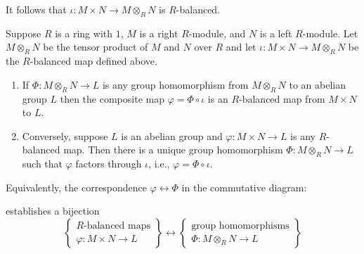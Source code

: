 \documentclass[12pt, a4paper, oneside, openright, titlepage]{book}
\begin{document}
It follows that $\iota:M\times N\rightarrow M\otimes_RN$ is $R$-balanced. 

\begin{thm}
    Suppose $R$ is a ring with $1$, $M$ is a right $R$-module, and $N$ is a left $R$-module. Let $M\otimes_RN$ be the tensor product of $M$ and $N$ over $R$ and let $\iota:M\times N\rightarrow M\otimes_RN$ be the $R$-balanced map defined above.
    \begin{enumerate}
        \item If $\Phi:M\otimes_RN\rightarrow L$ is any group homomorphism from $M\otimes_RN$ to an abelian group $L$ then the composite map $\varphi = \Phi\circ \iota$ is an $R$-balanced map from $M\times N$ to $L$.
        \item Conversely, suppose $L$ is an abelian group and $\varphi:M\times N\rightarrow L$ is any $R$-balanced map. Then there is a unique group homomorphism $\Phi:M\otimes_RN\rightarrow L$ such that $\varphi$ factors through $\iota$, i.e., $\varphi = \Phi \circ \iota$.
    \end{enumerate}
    Equivalently, the correspondence $\varphi \leftrightarrow \Phi$ in the commutative diagram:
    \begin{center}
    \end{center}
    establishes a bijection \begin{equation*}
        \left\{\begin{array}{c} R\text{-balanced maps} \\ \varphi:M\times N\rightarrow L\end{array}\right\}\leftrightarrow \left\{\begin{array}{c} \text{group homomorphisms} \\ \Phi:M\otimes_R N\rightarrow L\end{array}\right\}
    \end{equation*}
\end{thm}
\end{document}
